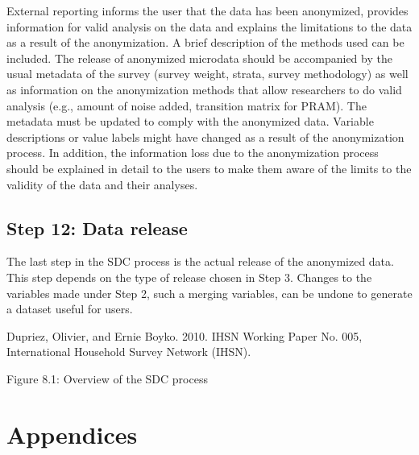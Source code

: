 \documentclass[letterpaper,10pt,english]{sphinxmanual}
\begin{document}
External reporting informs the user that the data has been anonymized,
provides information for valid analysis on the data and explains the
limitations to the data as a result of the anonymization. A brief
description of the methods used can be included. The release of
anonymized microdata should be accompanied by the usual metadata of the
survey (survey weight, strata, survey methodology) as well as
information on the anonymization methods that allow researchers to do
valid analysis (e.g., amount of noise added, transition matrix for
PRAM).  The
metadata must be updated to comply with the anonymized data. Variable
descriptions or value labels might have changed as a result of the
anonymization process. In addition, the information loss due to the
anonymization process should be explained in detail to the users to make
them aware of the limits to the validity of the data and their analyses.


\section{Step 12: Data release}
\label{\detokenize{process:step-12-data-release}}
The last step in the SDC process is the actual release of the anonymized
data. This step depends on the type of release chosen in Step 3. Changes
to the variables made under Step 2, such a merging variables, can be
undone to generate a dataset useful for users.


Dupriez, Olivier, and Ernie Boyko. 2010.  IHSN Working Paper No.
005, International Household Survey Network (IHSN).

\noindent{}

Figure 8.1: Overview of the SDC process


\chapter{Appendices}
\label{\detokenize{appendices::doc}}\label{\detokenize{appendices:appendices}}

\section{ }
\label{\detokenize{appendices:appendix-a-overview-of-case-study-variables}}
\end{document}
